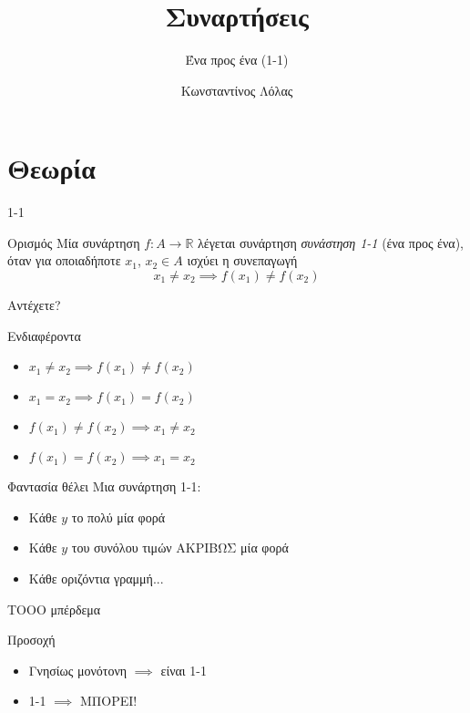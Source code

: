 \documentclass{presentation}
\title{Συναρτήσεις}
\subtitle{Ένα προς ένα (1-1)}
\author[Λόλας]{Κωνσταντίνος Λόλας }
\institute[$10^ο$ ΓΕΛ]{$10^ο$ ΓΕΛ Θεσσαλονίκης}
\date{}
\begin{document}
\begin{frame}
  \titlepage
\end{frame}

\section{Θεωρία}
\begin{frame}{1-1}
  \begin{block}{Ορισμός}
    Μία συνάρτηση $f:Α\to\mathbb{R}$ λέγεται συνάρτηση \emph{συνάστηση 1-1} (ένα προς ένα), όταν για οποιαδήποτε $x_1$, $x_2\in Α$ ισχύει η συνεπαγωγή
    $$x_1\ne x_2 \implies f(x_1)\ne f(x_2)$$
  \end{block}
\end{frame}

\begin{frame}{Αντέχετε?}
  \begin{exampleblock}{Ενδιαφέροντα}
    \begin{itemize}
      \item $x_1\ne x_2 \implies f(x_1)\ne f(x_2)$
      \item $x_1= x_2 \implies f(x_1)= f(x_2)$
      \item $f(x_1)\ne f(x_2) \implies x_1\ne x_2$
      \item $f(x_1)= f(x_2) \implies x_1= x_2$
    \end{itemize}
  \end{exampleblock}
\end{frame}

\begin{frame}{Φαντασία θέλει}
  Μια συνάρτηση 1-1:
  \begin{itemize}[<+-|alert@+>]
    \item Κάθε $y$ το πολύ μία φορά
    \item Κάθε $y$ του συνόλου τιμών ΑΚΡΙΒΩΣ μία φορά
    \item Κάθε οριζόντια γραμμή...
  \end{itemize}
\end{frame}

\begin{frame}{ΤΟΟΟ μπέρδεμα}
  \begin{alertblock}{Προσοχή}
    \begin{itemize}
      \item Γνησίως μονότονη $\implies$ \pause είναι 1-1 \pause
      \item  1-1 $\implies$ \pause ΜΠΟΡΕΙ!
    \end{itemize}
  \end{alertblock}
\end{frame}
\end{document}
